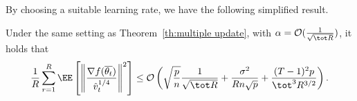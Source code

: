 \documentclass[11pt]{article}
\begin{document}
By choosing a suitable learning rate, we have the following simplified result.
\begin{Corollary}\label{coro:main}
Under the same setting as Theorem~\ref{th:multiple update}, with $\alpha = \mathcal{O}(\frac{1}{ \sqrt{\tot R}})$, it holds that
\begin{align} \label{coro:rate}
    \frac{1}{R}\sum_{r=1}^R  \EE\left[ \left\| \frac{\nabla f(\overline{\theta_t})}{\hat v_t^{1/4}}   \right \|^2 \right] \leq \mathcal{O}\left( \sqrt{\frac{ p}{n}} \frac{1}{\sqrt{\tot R}} + \frac{\sigma^2 }{R n\sqrt{p}}+\frac{(T-1)^2p}{\tot^3 R^{3/2}}\right).
\end{align}
\end{Corollary}



\end{document}
